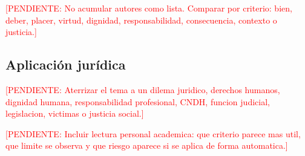 \documentclass[
	spanish,
	letterpaper, oneside
]{article}
\newcommand{\pendiente}[1]{\textcolor{red}{[PENDIENTE: #1]}}
\begin{document}
\pendiente{No acumular autores como lista. Comparar por criterio: bien, deber, placer, virtud, dignidad, responsabilidad, consecuencia, contexto o justicia.}

\subsection{Aplicación jurídica}

\pendiente{Aterrizar el tema a un dilema juridico, derechos humanos, dignidad humana, responsabilidad profesional, CNDH, funcion judicial, legislacion, victimas o justicia social.}

\pendiente{Incluir lectura personal academica: que criterio parece mas util, que limite se observa y que riesgo aparece si se aplica de forma automatica.}

%
%
%
\end{document}
